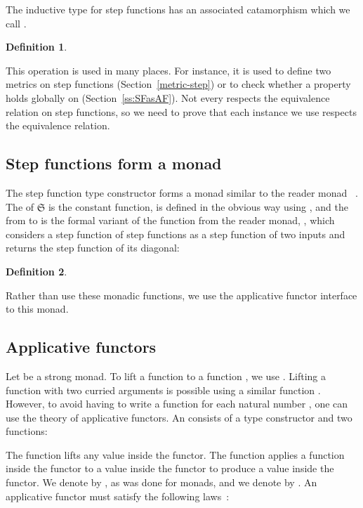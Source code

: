 \documentclass{elsarticle}
\newtheorem{definition}{Definition}
\newcommand{\SF}{\ensuremath{\mathfrak{S}}}
\begin{document}
The inductive type for step functions has an associated catamorphism which we
call .

\begin{definition}
  
\end{definition}

This  operation is used in many places. For instance, it
is used to define two metrics on step functions (Section~\ref{metric-step}) or
to check whether a property holds globally on 
(Section~\ref{ss:SFasAF}). Not every  respects the
equivalence relation on step functions, so we need to prove that each
 instance we use respects the equivalence relation.

\subsection{Step functions form a monad}\label{StepF-mon}The step function
type constructor  forms a monad similar to the reader monad ~{\cite{Wadler92b}}. The  of {\SF} is the
constant function,  is defined in the obvious way using
, and the  from  to  is the formal
variant of the  function from the reader monad,
, which considers a step function of
step functions as a step function of two inputs and returns the step function
of its diagonal:

\begin{definition}
  
\end{definition}

Rather than use these monadic functions, we use the applicative functor
interface to this monad.

\subsection{Applicative functors}\label{ss:applicative}Let  be a
strong monad. To lift a function  to a function
, we use . Lifting a
function with two curried arguments is possible using a similar function
. However, to avoid having to write a function
 for each natural number , one can use the
theory of applicative functors. An consists of a type constructor
 and two functions:

The function  lifts any value inside the functor. The
 function applies a function inside the functor to a value
inside the functor to produce a value inside the functor. We
denote  by , as was done for monads, and
we denote  by . An applicative functor
must satisfy the following laws~{\cite{mcbride:2008}}:
\end{document}
